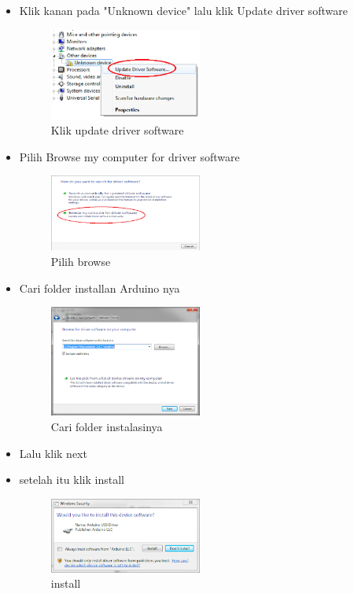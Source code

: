 \begin{enumerate}
\begin{itemize}
\item Klik kanan pada "Unknown device" lalu klik Update driver software

\begin{figure}[ht!]
\includegraphics[width=5cm]{figures/5/1174069/4fny.png}
\centering
		\caption{Klik update driver software}
\end{figure}
	
\item Pilih Browse my computer for driver software

\begin{figure}[ht!]
\includegraphics[width=5cm]{figures/5/1174069/5fny.png}
\centering
		\caption{Pilih browse}
\end{figure}
	
\item Cari folder installan Arduino nya

\begin{figure}[ht!]
\includegraphics[width=5cm]{figures/5/1174069/6fny.png}
\centering
		\caption{Cari folder instalasinya}
\end{figure}
	
\item Lalu klik next


	
\item setelah itu klik install
\begin{figure}[ht!]
\includegraphics[width=5cm]{figures/5/1174069/7fny.png}
\centering
		\caption{install}
\end{figure}


\end{itemize}
\end{enumerate}
